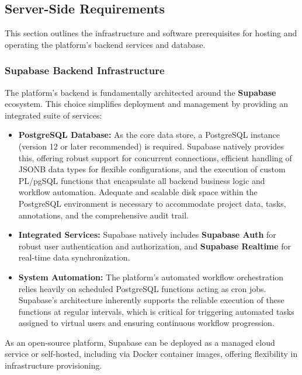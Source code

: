 \subsection{Server-Side Requirements}
This section outlines the infrastructure and software prerequisites for hosting and operating the platform's backend services and database.

\subsubsection{Supabase Backend Infrastructure}
The platform's backend is fundamentally architected around the \textbf{Supabase} ecosystem. This choice simplifies deployment and management by providing an integrated suite of services:
\begin{itemize}
    \item \textbf{PostgreSQL Database:} As the core data store, a PostgreSQL instance (version 12 or later recommended) is required. Supabase natively provides this, offering robust support for concurrent connections, efficient handling of JSONB data types for flexible configurations, and the execution of custom PL/pgSQL functions that encapsulate all backend business logic and workflow automation. Adequate and scalable disk space within the PostgreSQL environment is necessary to accommodate project data, tasks, annotations, and the comprehensive audit trail.
    \item \textbf{Integrated Services:} Supabase natively includes \textbf{Supabase Auth} for robust user authentication and authorization, and \textbf{Supabase Realtime} for real-time data synchronization.
    \item \textbf{System Automation:} The platform's automated workflow orchestration relies heavily on scheduled PostgreSQL functions acting as cron jobs. Supabase's architecture inherently supports the reliable execution of these functions at regular intervals, which is critical for triggering automated tasks assigned to virtual users and ensuring continuous workflow progression.
\end{itemize}
As an open-source platform, Supabase can be deployed as a managed cloud service or self-hosted, including via Docker container images, offering flexibility in infrastructure provisioning.

